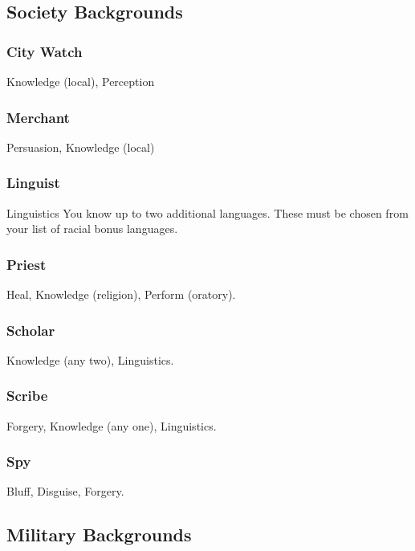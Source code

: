 
\subsection{Society Backgrounds}

\subsubsection{City Watch}
 Knowledge (local), Perception

\subsubsection{Merchant}
 Persuasion, Knowledge (local)

\subsubsection{Linguist}
 Linguistics
 You know up to two additional languages. These must be chosen from your list of racial bonus languages.

\subsubsection{Priest}
 Heal, Knowledge (religion), Perform (oratory).

\subsubsection{Scholar}
 Knowledge (any two), Linguistics.

\subsubsection{Scribe}
 Forgery, Knowledge (any one), Linguistics.

\subsubsection{Spy}
 Bluff, Disguise, Forgery.

\subsection{Military Backgrounds}

